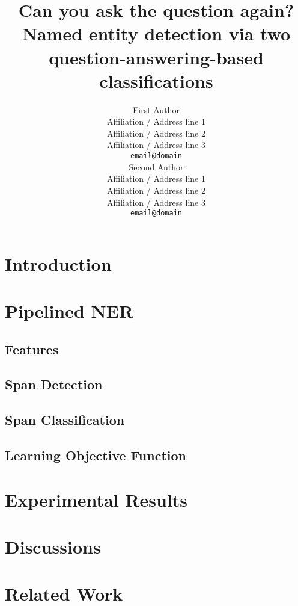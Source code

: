 \documentclass[11pt]{article}
\title{Can you ask the question again? Named entity detection via two question-answering-based classifications}
\author{First Author \\
  Affiliation / Address line 1 \\
  Affiliation / Address line 2 \\
  Affiliation / Address line 3 \\
  \texttt{email@domain} \\\And
  Second Author \\
  Affiliation / Address line 1 \\
  Affiliation / Address line 2 \\
  Affiliation / Address line 3 \\
  \texttt{email@domain} \\}
\begin{document}
\maketitle

\begin{abstract}

\end{abstract}

\section{Introduction}
\label{sec:intro}


\section{Pipelined NER}
\label{sec:method}


\subsection{Features}
\label{sec:features}


\subsection{Span Detection}
\label{sec:span}


\subsection{Span Classification}
\label{sec:class}


\subsection{Learning Objective Function}
\label{sec:loss}


\section{Experimental Results}
\label{sec:exp}


\section{Discussions}
\label{sec:discussion}


\section{Related Work}
\label{sec:related}

\end{document}
